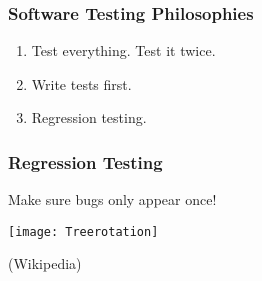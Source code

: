 \begin{frame}[fragile]
\frametitle{Software Testing Philosophies}

\begin{enumerate}
\item Test everything. Test it twice.
\item Write tests first.
\item Regression testing.
\end{enumerate}
\end{frame}

\begin{frame}[fragile]
\frametitle{Regression Testing}

Make sure bugs only appear once!

\end{frame}

\begin{frame}[fragile]

\centering
\texttt{[image: Treerotation]}

\begin{flushright}
(Wikipedia)
\end{flushright}
\end{frame}




